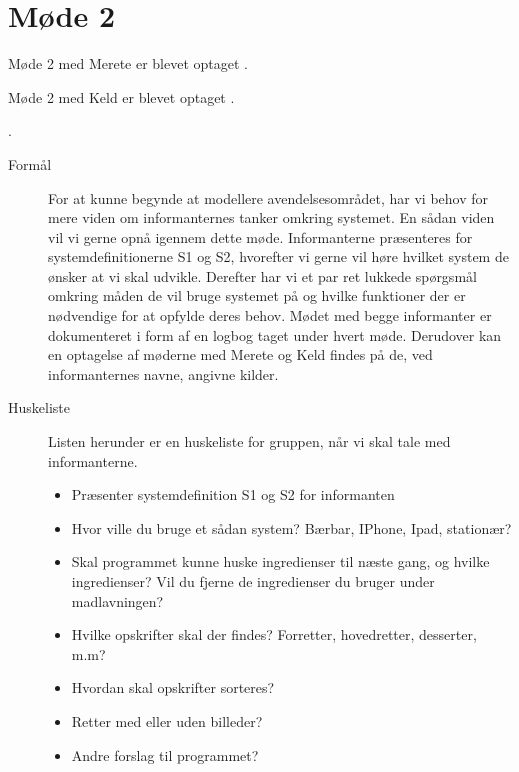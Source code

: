 \section{Møde 2}

Møde 2 med Merete er blevet optaget \cite{moede2merete}.

Møde 2 med Keld er blevet optaget \cite{moede2keld}.

\cite{moede1merete}.

\begin{description}

\item[Formål]
For at kunne begynde at modellere avendelsesområdet, har vi behov for mere viden om informanternes tanker omkring systemet. En sådan viden vil vi gerne opnå igennem dette møde. Informanterne præsenteres for systemdefinitionerne S1 og S2, hvorefter vi gerne vil høre hvilket system de ønsker at vi skal udvikle. Derefter har vi et par ret lukkede spørgsmål omkring måden de vil bruge systemet på og hvilke funktioner der er nødvendige for at opfylde deres behov.
Mødet med begge informanter er dokumenteret i form af en logbog taget under hvert møde. Derudover kan en optagelse af møderne med Merete\cite{moede2merete} og Keld\cite{moede1keld} findes på de, ved informanternes navne, angivne kilder.

\item[Huskeliste] Listen herunder er en huskeliste for gruppen, når vi skal tale med informanterne.

\begin{itemize}[noitemsep]
\item Præsenter systemdefinition S1 og S2 for informanten
\item Hvor ville du bruge et sådan system? Bærbar, IPhone, Ipad, stationær?
\item Skal programmet kunne huske ingredienser til næste gang, og hvilke ingredienser? Vil du fjerne de ingredienser du bruger under madlavningen?
\item Hvilke opskrifter skal der findes? Forretter, hovedretter, desserter, m.m?
\item Hvordan skal opskrifter sorteres?
\item Retter med eller uden billeder?
\item Andre forslag til programmet?
\end{itemize}


\end{description}
